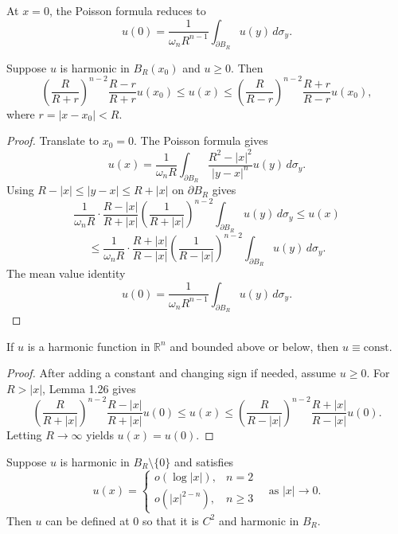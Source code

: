 \begin{remark}\label{hanlin:remark-poisson-mean-value}
At $x=0$, the Poisson formula reduces to
\[
u(0) = \frac{1}{\omega_n R^{n-1}} \int_{\partial B_R} u(y)\,d\sigma_y.
\]
\end{remark}

\begin{lemma}\label{hanlin:lemma-harnack-ball}
Suppose $u$ is harmonic in $B_R(x_0)$ and $u \ge 0$. Then
\[
\left(\frac{R}{R+r}\right)^{n-2}\frac{R-r}{R+r}u(x_0) \le u(x) \le \left(\frac{R}{R-r}\right)^{n-2}\frac{R+r}{R-r}u(x_0),
\]
where $r = |x-x_0| < R$.
\end{lemma}

\begin{proof}
\sketch Translate to $x_0=0$. The Poisson formula gives
\[
u(x) = \frac{1}{\omega_n R}\int_{\partial B_R}\frac{R^2-|x|^2}{|y-x|^n}u(y)\,d\sigma_y.
\]
Using $R-|x|\le|y-x|\le R+|x|$ on $\partial B_R$ gives
\[
\frac{1}{\omega_n R}\cdot\frac{R-|x|}{R+|x|}\left(\frac{1}{R+|x|}\right)^{n-2}\int_{\partial B_R}u(y)\,d\sigma_y \le u(x)
\]
\[
\le \frac{1}{\omega_n R}\cdot\frac{R+|x|}{R-|x|}\left(\frac{1}{R-|x|}\right)^{n-2}\int_{\partial B_R}u(y)\,d\sigma_y.
\]
The mean value identity
\[
u(0) = \frac{1}{\omega_n R^{n-1}}\int_{\partial B_R}u(y)\,d\sigma_y.
\]
\end{proof}

\begin{corollary}\label{hanlin:corollary-liouville-poisson}
If $u$ is a harmonic function in $\mathbb{R}^n$ and bounded above or below, then $u \equiv \mathrm{const}$.
\end{corollary}

\begin{proof}
\sketch After adding a constant and changing sign if needed, assume $u\ge0$.
For $R>|x|$, Lemma 1.26 gives
\[
\left(\frac{R}{R+|x|}\right)^{n-2}\frac{R-|x|}{R+|x|}u(0) \le u(x) \le \left(\frac{R}{R-|x|}\right)^{n-2}\frac{R+|x|}{R-|x|}u(0).
\]
Letting $R\to\infty$ yields $u(x)=u(0)$.
\end{proof}

\begin{theorem}\label{hanlin:thm-removable-singularity}
Suppose $u$ is harmonic in $B_R \setminus \{0\}$ and satisfies
\[
u(x)=
\begin{cases}
o(\log |x|), & n=2 \\
o(|x|^{2-n}), & n\ge 3
\end{cases}
\quad\text{as } |x|\to 0.
\]
Then $u$ can be defined at $0$ so that it is $C^2$ and harmonic in $B_R$.
\end{theorem}

